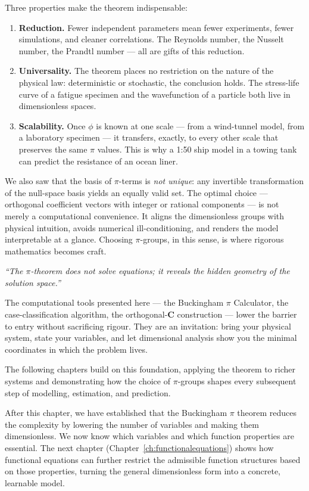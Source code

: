 Three properties make the theorem indispensable:
\begin{enumerate}
  \item \textbf{Reduction.} Fewer independent parameters mean fewer experiments, fewer
    simulations, and cleaner correlations. The Reynolds number, the Nusselt number,
    the Prandtl number — all are gifts of this reduction.
  \item \textbf{Universality.} The theorem places no restriction on the nature of the
    physical law: deterministic or stochastic, the conclusion
    holds. The stress-life curve of a fatigue specimen and the wavefunction of a
    particle both live in dimensionless spaces.
  \item \textbf{Scalability.} Once $\phi$ is known at one scale — from a wind-tunnel model,
    from a laboratory specimen — it transfers, exactly, to every other scale that
    preserves the same $\pi$ values. This is why a 1:50 ship model in a towing tank
    can predict the resistance of an ocean liner.
\end{enumerate}

We also saw that the basis of $\pi$-terms is \emph{not unique}: any invertible
transformation of the null-space basis yields an equally valid set. The optimal
choice — orthogonal coefficient vectors with integer or rational components — is
not merely a computational convenience. It aligns the dimensionless groups with
physical intuition, avoids numerical ill-conditioning, and renders the model
interpretable at a glance. Choosing $\pi$-groups, in this sense, is where
rigorous mathematics becomes craft.

\begin{center}
\itshape
``The $\pi$-theorem does not solve equations; it reveals the hidden geometry
of the solution space.''
\end{center}

The computational tools presented here — the Buckingham $\pi$ Calculator, the
case-classification algorithm, the orthogonal-$\mathbf{C}$ construction — lower
the barrier to entry without sacrificing rigour. They are an invitation: bring
your physical system, state your variables, and let dimensional analysis show you
the minimal coordinates in which the problem lives.

The following chapters build on this foundation, applying the theorem to richer
systems and demonstrating how the choice of $\pi$-groups shapes every subsequent
step of modelling, estimation, and prediction.

After this chapter, we have established that the Buckingham $\pi$ theorem reduces the complexity by lowering the number of variables and making them dimensionless. We now know which variables and which function properties are essential. The next chapter (Chapter~\ref{ch:functionalequations}) shows how functional equations can further restrict the admissible function structures based on those properties, turning the general dimensionless form into a concrete, learnable model. 